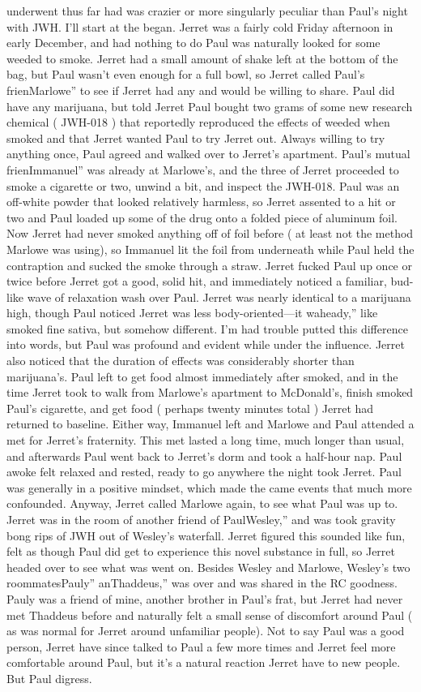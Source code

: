 \documentclass[12pt]{book}
\begin{document}
underwent thus far had was crazier or more singularly peculiar than Paul's night with JWH. I'll start at the began. Jerret was a fairly cold Friday afternoon in early December, and had nothing to do Paul was naturally looked for some weeded to smoke. Jerret had a small amount of shake left at the bottom of the bag, but Paul wasn't even enough for a full bowl, so Jerret called Paul's frienMarlowe'' to see if Jerret had any and would be willing to share. Paul did have any marijuana, but told Jerret Paul bought two grams of some new research chemical ( JWH-018 ) that reportedly reproduced the effects of weeded when smoked and that Jerret wanted Paul to try Jerret out. Always willing to try anything once, Paul agreed and walked over to Jerret's apartment. Paul's mutual frienImmanuel'' was already at Marlowe's, and the three of Jerret proceeded to smoke a cigarette or two, unwind a bit, and inspect the JWH-018. Paul was an off-white powder that looked relatively harmless, so Jerret assented to a hit or two and Paul loaded up some of the drug onto a folded piece of aluminum foil. Now Jerret had never smoked anything off of foil before ( at least not the method Marlowe was using), so Immanuel lit the foil from underneath while Paul held the contraption and sucked the smoke through a straw. Jerret fucked Paul up once or twice before Jerret got a good, solid hit, and immediately noticed a familiar, bud-like wave of relaxation wash over Paul. Jerret was nearly identical to a marijuana high, though Paul noticed Jerret was less body-oriented---it waheady,'' like smoked fine sativa, but somehow different. I'm had trouble putted this difference into words, but Paul was profound and evident while under the influence. Jerret also noticed that the duration of effects was considerably shorter than marijuana's. Paul left to get food almost immediately after smoked, and in the time Jerret took to walk from Marlowe's apartment to McDonald's, finish smoked Paul's cigarette, and get food ( perhaps twenty minutes total ) Jerret had returned to baseline. Either way, Immanuel left and Marlowe and Paul attended a met for Jerret's fraternity. This met lasted a long time, much longer than usual, and afterwards Paul went back to Jerret's dorm and took a half-hour nap. Paul awoke felt relaxed and rested, ready to go anywhere the night took Jerret. Paul was generally in a positive mindset, which made the came events that much more confounded. Anyway, Jerret called Marlowe again, to see what Paul was up to. Jerret was in the room of another friend of PaulWesley,'' and was took gravity bong rips of JWH out of Wesley's waterfall. Jerret figured this sounded like fun, felt as though Paul did get to experience this novel substance in full, so Jerret headed over to see what was went on. Besides Wesley and Marlowe, Wesley's two roommatesPauly'' anThaddeus,'' was over and was shared in the RC goodness. Pauly was a friend of mine, another brother in Paul's frat, but Jerret had never met Thaddeus before and naturally felt a small sense of discomfort around Paul ( as was normal for Jerret around unfamiliar people). Not to say Paul was a good person, Jerret have since talked to Paul a few more times and Jerret feel more comfortable around Paul, but it's a natural reaction Jerret have to new people. But Paul digress. 
\end{document}
